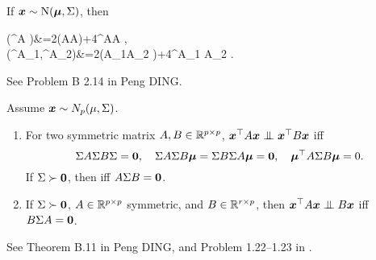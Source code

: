 \documentclass[10pt,a4paper]{book}
\begin{document}
\begin{thmbox}
	\begin{proposition}[Variance]\label{prop:var_MVN_quad}
		If ${\boldsymbol x}\sim\mathrm{N}({\boldsymbol\mu},\Sigma)$, then 
		\begin{sequation*}
			\begin{aligned}
			\Var(\x^\TT A \x)&=2\tr(A\Sigma A\Sigma)+4\bam^\TT A\Sigma A \bam, \\
			\Cov(\x^\TT A_1\x,\x^\TT A_2\x)&=2\tr(A_1\Sigma A_2 \Sigma)+4\bam^\TT A_1 \Sigma A_2 \bam.
			\end{aligned}
		\end{sequation*} 
	\end{proposition}
\end{thmbox}
See Problem B 2.14 in Peng DING. 

\begin{thmbox}
	\begin{theorem}\label{thm:MVN_quad_indep}
		Assume ${\boldsymbol x}\sim N_p(\mu,\Sigma)$. 
		\begin{enumerate}
			\item 		For two symmetric matrix $A,B\in\mathbb R^{p\times p}$, $\x^\TT A \x\indep \x^\TT B\x$ iff  
			\begin{equation*}
				\Sigma A\Sigma B\Sigma={\boldsymbol 0},\quad\Sigma A\Sigma B{\boldsymbol\mu}=\Sigma B\Sigma A{\boldsymbol\mu}={\boldsymbol 0},\quad{\boldsymbol\mu}^\top A\Sigma B{\boldsymbol\mu}=0.
			\end{equation*}	
			If $\Sigma\succ {\boldsymbol 0}$, then iff $A\Sigma B={\boldsymbol 0}$.  
			\item If $\Sigma\succ {\boldsymbol 0}$, $A\in\mathbb R^{p\times p}$ symmetric, and $B\in\mathbb R^{r\times p}$, then $\x^\TT A\x \indep B\x$ iff $B\Sigma A={\boldsymbol 0}$.    
		\end{enumerate}
	\end{theorem}
\end{thmbox}
See Theorem B.11 in Peng DING, and Problem 1.22--1.23 in \cite{muirhead1982aspects}.
\end{document}
